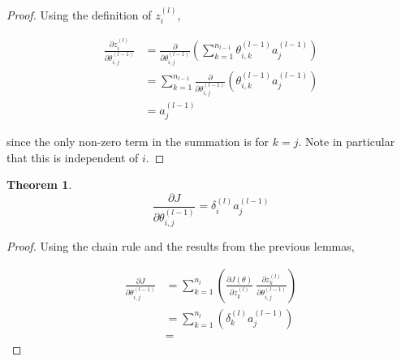 \documentclass{article}[11pt]
\newtheorem{theorem}{Theorem}
\begin{document}
        \begin{proof}
            
            Using the definition of $z^{(l)}_i$,
            
            $$ \begin{aligned}
            \frac{\partial z^{(l)}_i}{\partial \theta^{(l-1)}_{i,j}}
            &= \frac{\partial}{\partial \theta^{(l-1)}_{i,j}} \left( \sum_{k=1}^{n_{l-1}} \theta^{(l-1)}_{i,k} a^{(l-1)}_j \right) \\
            &= \sum_{k=1}^{n_{l-1}} \frac{\partial}{\partial \theta^{(l-1)}_{i,j}} \left( \theta^{(l-1)}_{i,k} a^{(l-1)}_j \right) \\
            &= a^{(l-1)}_j
            \end{aligned} $$
            
            since the only non-zero term in the summation is for $k = j$. Note in particular that this is independent of $i$.
            
        \end{proof}
        
        
        
        
        \begin{theorem}
            
            $$
            \frac{\partial J}{\partial \theta^{(l-1)}_{i,j}} = \delta^{(l)}_i a^{(l-1)}_j
            $$
            
        \end{theorem}
        
        \begin{proof}
        
            Using the chain rule and the results from the previous lemmas,
            
            $$ \begin{aligned}
            \frac{\partial J}{\partial \theta^{(l-1)}_{i,j}}
            &= \sum_{k=1}^{n_l} \left( \frac{\partial J(\theta)}{\partial z^{(l)}_k} \ \frac{\partial z^{(l)}_k}{\partial \theta^{(l-1)}_{i,j}} \right) \\
            &= \sum_{k=1}^{n_l} \left( \delta^{(l)}_k a^{(l-1)}_j \right) \\
            &= 
            \end{aligned}$$
        
        \end{proof}
        
        
\end{document}

